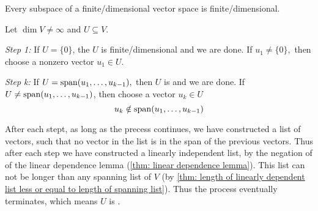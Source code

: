 \setcounter{thm}{24}
\begin{thm} 
  \label{thm: finite-dimensional subspace}
  Every subspace of a finite\-/dimensional vector space is finite\-/dimensional.
\end{thm}
\begin{prf}
  Let $\dim V \neq \infty$ and $U \subseteq V$.
  
  \emph{Step 1:} If $U = \{0\}$, the $U$ is finite\-/dimensional and we are done. If $u_1 \neq \{0\},$ then choose a nonzero vector $u_1 \in U$.
  
  \emph{Step k:} If $ U = \operatorname{span} (u_1, \ldots, u_{k-1}),$ then $U$ is \fd and we are done. If $U\neq \operatorname{span} (u_1, \ldots, u_{k-1})$, then choose a vector $u_k \in U$ \st 
  \begin{equation}
    u_k \notin \operatorname{span} (u_1, \ldots, u_{k-1})
  \end{equation}
  
  After each stept, as long as the precess continues, we have constructed a list of vectors, such that no vector in the list is in the span of the previous vectors. Thus after each step we have constructed a linearly independent list, by the negation of of the linear dependence lemma (\ref{thm: linear dependence lemma}).
  This list can not be longer than any spanning list of $V$ (by \ref{thm: length of linearly dependent list less or equal to length of spanning list}).
  Thus the process eventually terminates, which means $U$ is \fd.
\end{prf}